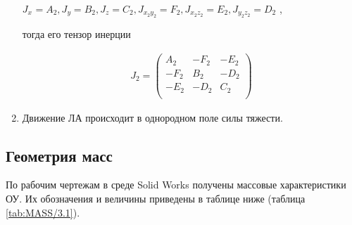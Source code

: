 \begin{enumerate}
	\( J_{x_{}}=A_{2},J_{y}=B_{2},J_{z}=C_{2},J_{x_{2}y_{2}}=F_{2},J_{x_{2}z_{2}}=E_{2},J_{y_{2}z_{2}}=D_{2} \) ,\par
	
	тогда его тензор инерции\par
	
	\begin{equation}
	\label{eq:p3:7}
	\begin{alignedat}{2}
	J_{2}= \left( \begin{matrix}
	A_{2}  &  -F_{2}  &  -E_{2}\\
	-F_{2}  &  B_{2}  &  -D_{2}\\
	-E_{2}  &  -D_{2}  &  C_{2}\\
	\end{matrix}
	\right) 
	\end{alignedat}
	\end{equation}	
	\item Движение ЛА происходит в однородном поле силы тяжести.
\end{enumerate}


\subsection{Геометрия масс} \label{sec:ch3/sec4}

По рабочим чертежам в среде Solid Works получены массовые характеристики ОУ. Их обозначения и величины приведены в таблице ниже (таблица \ref{tab:MASS/3.1}).



